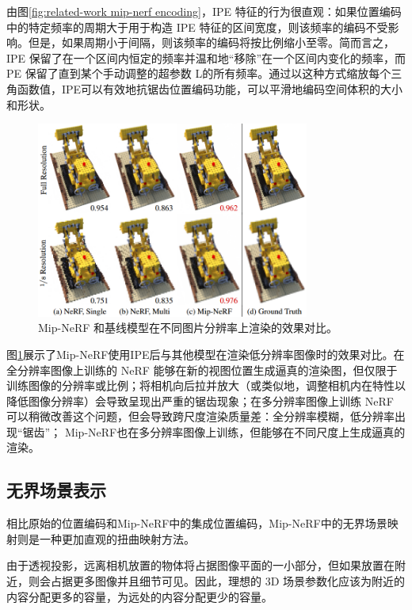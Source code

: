 由图\ref{fig:related-work mip-nerf encoding}，IPE 特征的行为很直观：如果位置编码中的特定频率的周期大于用于构造 IPE 特征的区间宽度，则该频率的编码不受影响。但是，如果周期小于间隔，则该频率的编码将按比例缩小至零。简而言之，IPE 保留了在一个区间内恒定的频率并温和地“移除”在一个区间内变化的频率，而 PE 保留了直到某个手动调整的超参数 L的所有频率。通过以这种方式缩放每个三角函数值，IPE可以有效地抗锯齿位置编码功能，可以平滑地编码空间体积的大小和形状。

\begin{figure}[h]
    \centering
    \includegraphics[width=0.8\textwidth]{undergraduate-thesis/images/related-work/mipnerf-multi-scale.png}
    \caption{Mip-NeRF\cite{barron_mip-nerf_2021} 和基线模型在不同图片分辨率上渲染的效果对比。}
    \label{fig:related-work mip-nerf results}
\end{figure}

图\ref{fig:related-work mip-nerf results}展示了Mip-NeRF使用IPE后与其他模型在渲染低分辨率图像时的效果对比。在全分辨率图像上训练的 NeRF 能够在新的视图位置生成逼真的渲染图，但仅限于训练图像的分辨率或比例；将相机向后拉并放大（或类似地，调整相机内在特性以降低图像分辨率）会导致呈现出严重的锯齿现象；在多分辨率图像上训练 NeRF 可以稍微改善这个问题，但会导致跨尺度渲染质量差：全分辨率模糊，低分辨率出现“锯齿”； Mip-NeRF也在多分辨率图像上训练，但能够在不同尺度上生成逼真的渲染。

\subsection{无界场景表示}
相比原始的位置编码和Mip-NeRF中的集成位置编码，Mip-NeRF中的无界场景映射则是一种更加直观的扭曲映射方法。

由于透视投影，远离相机放置的物体将占据图像平面的一小部分，但如果放置在附近，则会占据更多图像并且细节可见。因此，理想的 3D 场景参数化应该为附近的内容分配更多的容量，为远处的内容分配更少的容量。

